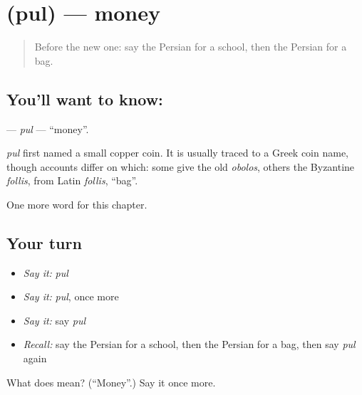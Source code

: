 \section[\texorpdfstring{\fa{پول} (pul)}{پول (pul)}]{ (pul) — money}

\label{lesson:FA-C49-pul}



\begin{quote}
Before the new one: say the Persian for a school, then the Persian for a bag.
\end{quote}

\subsection*{You'll want to know: }
\textbf{} — \emph{pul} — \textquotedblleft{}money\textquotedblright{}.

\begin{cousinweb}
\emph{pul} first named a small copper coin. It is usually traced to a Greek coin name, though accounts differ on which: some give the old \emph{obolos}, others the Byzantine \emph{follis}, from Latin \emph{follis}, \textquotedblleft{}bag\textquotedblright{}.
\end{cousinweb}

\begin{grammarlens}[title={What you've built}]
One more word for this chapter.
\end{grammarlens}

\subsection*{Your turn}
\begin{itemize}
\raggedright
  \item \emph{Say it:} \emph{pul}
  \item \emph{Say it:} \emph{pul}, once more
  \item \emph{Say it:} say \emph{pul}
  \item \emph{Recall:} say the Persian for a school, then the Persian for a bag, then say \emph{pul} again
\end{itemize}

\begin{tcolorbox}[breakable,colback=teal!4,colframe=teal!35!black,title={Before you move on}]
What does  mean? (\textquotedblleft{}Money\textquotedblright{}.) Say it once more.
\end{tcolorbox}
